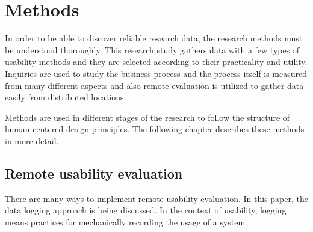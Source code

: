 \documentclass[12pt,a4paper,oneside,pdftex]{report}
\begin{document}

% 

\chapter{Methods}
\label{chapter:methods}
In order to be able to discover reliable research data, the research methods must be understood thoroughly. This research study gathers data with a few types of usability methods and they are selected according to their practicality and utility.
Inquiries are used to study the business process and the process itself is measured from many different aspects and also remote evaluation is utilized to gather data easily from distributed locations. 

Methods are used in different stages of the research to follow the structure of human-centered design principles. The following chapter describes these methods in more detail.  

\section{Remote usability evaluation}
\label{sec:rue}

There are many ways to implement remote usability evaluation. In this paper, the data logging approach is being discussed. In the context of usability, logging means practices for mechanically recording the usage of a system.
\end{document}
